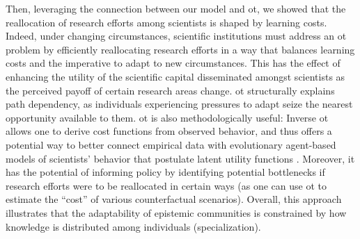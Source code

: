 \documentclass{article}
\begin{document}
Then, leveraging the connection between our model and \gls{ot}, we showed that the reallocation of research efforts among scientists is shaped by learning costs. Indeed, under changing circumstances, scientific institutions must address an \gls{ot} problem by efficiently reallocating research efforts in a way that balances learning costs and the imperative to adapt to new circumstances. This has the effect of enhancing the utility of the scientific capital disseminated amongst scientists as the perceived payoff of certain research areas change. \gls{ot} structurally explains path dependency, as individuals experiencing pressures to adapt seize the nearest opportunity available to them. \gls{ot} is also methodologically useful: Inverse \gls{ot} allows one to derive cost functions from observed behavior, and thus offers a potential way to better connect empirical data with evolutionary agent-based models of scientists' behavior that postulate latent utility functions \citep{Wu2023}. Moreover, it has the potential of informing policy by identifying potential bottlenecks if research efforts were to be reallocated in certain ways (as one can use \gls{ot} to estimate the ``cost'' of various counterfactual scenarios). Overall, this approach illustrates that the adaptability of epistemic communities is constrained by how knowledge is distributed among individuals (specialization). %
\end{document}
